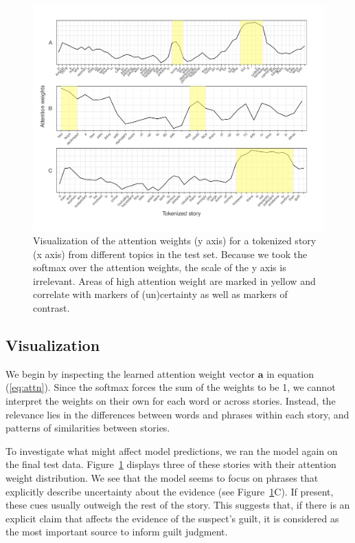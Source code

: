 \documentclass[11pt,a4paper]{article}
\begin{document}
\begin{figure}[t]
  \centering
  \includegraphics[width=1\linewidth]{graphs/attention-marked.pdf}
  \caption{Visualization of the attention weights (y axis) for a tokenized story (x axis) from different topics in the test set. Because we took the softmax over the attention weights, the scale of the y axis is irrelevant. Areas of high attention weight are marked in yellow and correlate with markers of (un)certainty as well as markers of contrast.}
  \label{fig:viz}
\end{figure}

\subsection{Visualization}

We begin by inspecting the learned attention weight vector $\mathbf{a}$ in equation (\ref{eq:attn}). Since the softmax forces the sum of the weights to be 1, we cannot interpret the weights on their own for each word or across stories. Instead, the relevance lies in the differences between words and phrases within each story, and patterns of similarities between stories.

To investigate what might affect model predictions, we ran the model again on the final test data. Figure~\ref{fig:viz} displays three of these stories with their attention weight distribution.
We see that the model seems to focus on phrases that explicitly describe uncertainty about the evidence (see Figure~\ref{fig:viz}C). If present, these cues usually outweigh the rest of the story. This suggests that, if there is an explicit claim that affects the evidence of the suspect's guilt, it is considered as the most important source to inform guilt judgment.
\end{document}
